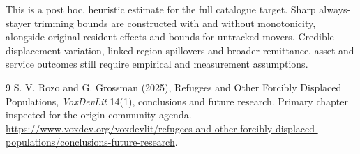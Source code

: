\documentclass[11pt]{article}
\begin{document}
This is a post hoc, heuristic estimate for the full catalogue target.
Sharp always-stayer trimming bounds are constructed with and without monotonicity, alongside original-resident effects and bounds for untracked movers. Credible displacement variation, linked-region spillovers and broader remittance, asset and service outcomes still require empirical and measurement assumptions.

\begin{thebibliography}{9}
 S. V. Rozo and G. Grossman (2025), Refugees and Other Forcibly Displaced Populations, \emph{VoxDevLit} 14(1), conclusions and future research. Primary chapter inspected for the origin-community agenda. \url{https://www.voxdev.org/voxdevlit/refugees-and-other-forcibly-displaced-populations/conclusions-future-research}.
\end{thebibliography}
\end{document}
